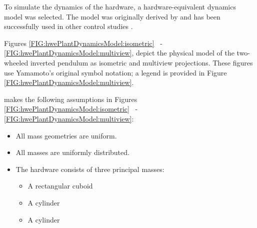 \documentclass[crop=false,float=true,class=scrreprt]{standalone}
\begin{document}
To simulate the dynamics of the hardware, a hardware-equivalent dynamics model was selected.
The model was originally derived by
\textcite{REF:online:2009-yamamoto}
and has been successfully used in other control studies
\cite{REF:thesis:masters:2012-peltier}.

\iffalse
The hardware-equivalent dynamics model is defined in this chapter for convenience with the following order:

\begin{enumerate}[leftmargin=*]

\item A model is developed, which contains nonlinear relations.

\item Key assumptions are made.\\
      \hspace*{\fill}{\fns[\tif{These linearize and otherwise simplify the originally nonlinear mathematical relationships.}]}

\item The methodology of calculating nonintuitive parameters is discussed.

\end{enumerate}
\fi

Figures
\ref{FIG:hwePlantDynamicsModel:isometric}~%
-~%
\ref{FIG:hwePlantDynamicsModel:multiview},
depict the physical model of the two-wheeled inverted pendulum
as isometric and multiview projections.
These figures use Yamamoto's original symbol notation;
a legend is provided in Figure~%
\ref{FIG:hwePlantDynamicsModel:multiview}.

\textcite{REF:online:2009-yamamoto} makes the following assumptions in Figures
\ref{FIG:hwePlantDynamicsModel:isometric}~%
-~%
\ref{FIG:hwePlantDynamicsModel:multiview}:

\begin{itemize}[leftmargin=*]

\item All mass geometries are uniform.

\item All masses are uniformly distributed.

\item The hardware consists of three principal masses:
      \begin{itemize}[leftmargin=*,label=$\cdot$,itemsep=-1em]
      \item A rectangular cuboid
      \item A cylinder
      \item A cylinder
      \end{itemize}


\end{itemize}
\end{document}

